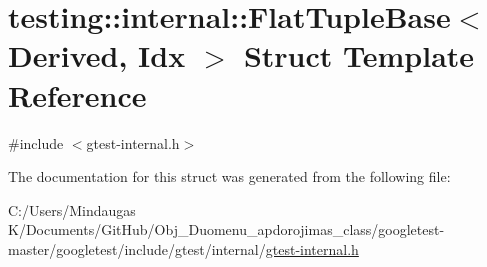 \hypertarget{structtesting_1_1internal_1_1_flat_tuple_base}{}\section{testing\+::internal\+::Flat\+Tuple\+Base$<$ Derived, Idx $>$ Struct Template Reference}
\label{structtesting_1_1internal_1_1_flat_tuple_base}


{\ttfamily \#include $<$gtest-\/internal.\+h$>$}



The documentation for this struct was generated from the following file\+:\begin{DoxyCompactItemize}
\item 
C\+:/\+Users/\+Mindaugas K/\+Documents/\+Git\+Hub/\+Obj\+\_\+\+Duomenu\+\_\+apdorojimas\+\_\+class/googletest-\/master/googletest/include/gtest/internal/\mbox{\hyperlink{googletest-master_2googletest_2include_2gtest_2internal_2gtest-internal_8h}{gtest-\/internal.\+h}}\end{DoxyCompactItemize}
